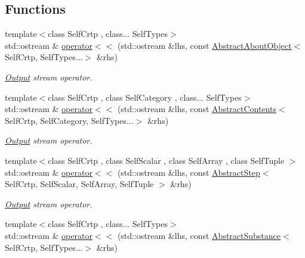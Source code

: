 \subsection*{Functions}
\begin{DoxyCompactItemize}
\item 
{\footnotesize template$<$class Self\-Crtp , class... Self\-Types$>$ }\\std\-::ostream \& \hyperlink{namespacemagrathea_a2ab2e7c5105b8d9de8fba009b17f7fa7}{operator$<$$<$} (std\-::ostream \&lhs, const \hyperlink{classmagrathea_1_1AbstractAboutObject}{Abstract\-About\-Object}$<$ Self\-Crtp, Self\-Types...$>$ \&rhs)
\begin{DoxyCompactList}\small\item\em \hyperlink{exceptionOutput}{Output} stream operator. \end{DoxyCompactList}\item 
{\footnotesize template$<$class Self\-Crtp , class Self\-Category , class... Self\-Types$>$ }\\std\-::ostream \& \hyperlink{namespacemagrathea_a8035a6dc27a898c793469300734394c7}{operator$<$$<$} (std\-::ostream \&lhs, const \hyperlink{classmagrathea_1_1AbstractContents}{Abstract\-Contents}$<$ Self\-Crtp, Self\-Category, Self\-Types...$>$ \&rhs)
\begin{DoxyCompactList}\small\item\em \hyperlink{exceptionOutput}{Output} stream operator. \end{DoxyCompactList}\item 
{\footnotesize template$<$class Self\-Crtp , class Self\-Scalar , class Self\-Array , class Self\-Tuple $>$ }\\std\-::ostream \& \hyperlink{namespacemagrathea_a9249ef80a0176ab456b2129ed6b0f715}{operator$<$$<$} (std\-::ostream \&lhs, const \hyperlink{classmagrathea_1_1AbstractStep}{Abstract\-Step}$<$ Self\-Crtp, Self\-Scalar, Self\-Array, Self\-Tuple $>$ \&rhs)
\begin{DoxyCompactList}\small\item\em \hyperlink{exceptionOutput}{Output} stream operator. \end{DoxyCompactList}\item 
{\footnotesize template$<$class Self\-Crtp , class... Self\-Types$>$ }\\std\-::ostream \& \hyperlink{namespacemagrathea_a6c5460d574f739b0b0af990e0e390a5f}{operator$<$$<$} (std\-::ostream \&lhs, const \hyperlink{classmagrathea_1_1AbstractSubstance}{Abstract\-Substance}$<$ Self\-Crtp, Self\-Types...$>$ \&rhs)

\end{DoxyCompactItemize}
